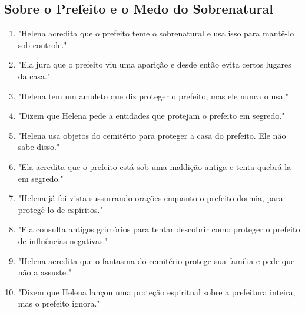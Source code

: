 \subsection*{Sobre o Prefeito e o Medo do Sobrenatural}
\begin{enumerate}
    \item "Helena acredita que o prefeito teme o sobrenatural e usa isso para mantê-lo sob controle."
    \item "Ela jura que o prefeito viu uma aparição e desde então evita certos lugares da casa."
    \item "Helena tem um amuleto que diz proteger o prefeito, mas ele nunca o usa."
    \item "Dizem que Helena pede a entidades que protejam o prefeito em segredo."
    \item "Helena usa objetos do cemitério para proteger a casa do prefeito. Ele não sabe disso."
    \item "Ela acredita que o prefeito está sob uma maldição antiga e tenta quebrá-la em segredo."
    \item "Helena já foi vista sussurrando orações enquanto o prefeito dormia, para protegê-lo de espíritos."
    \item "Ela consulta antigos grimórios para tentar descobrir como proteger o prefeito de influências negativas."
    \item "Helena acredita que o fantasma do cemitério protege sua família e pede que não a assuste."
    \item "Dizem que Helena lançou uma proteção espiritual sobre a prefeitura inteira, mas o prefeito ignora."
\end{enumerate}

